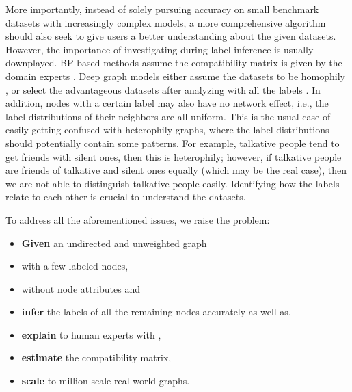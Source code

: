 
More importantly, instead of solely pursuing accuracy on small benchmark datasets with increasingly complex models, a more comprehensive algorithm should also seek to give users a better understanding about the given datasets. 
However, the importance of investigating \neteffect during label inference is usually downplayed.
BP-based methods assume the compatibility matrix is given by the domain experts \cite{DBLP:journals/pvldb/GatterbauerGKF15}.
Deep graph models either assume the datasets to be homophily \cite{kipf2016semi, wu2019simplifying}, or select the advantageous datasets after analyzing with all the labels \cite{ma2022is, lim2021large}.
In addition, nodes with a certain label may also have no network effect, i.e., the label distributions of their neighbors are all uniform. This is the usual case of easily getting confused with heterophily graphs, where the label distributions should potentially contain some patterns. For example, talkative people tend to get friends with silent ones, then this is heterophily; however, if talkative people are friends of talkative and silent ones equally (which may be the real case), then we are not able to distinguish talkative people easily. Identifying how the labels relate to each other is crucial to understand the datasets.

To address all the aforementioned issues, we raise the problem:
\begin{iprob}
	\hfill
	\begin{itemize}[leftmargin=20pt]
		\item {\bfseries Given} an undirected and unweighted graph
		\bit
			\item with a few labeled nodes,
			\item without node attributes and
		\eit
		\item {\bfseries infer} the labels of all the remaining nodes accurately as well as,
		\bit
			\item {\bfseries explain} to human experts with \neteffect,
			\item {\bfseries estimate} the compatibility matrix,
			\item {\bfseries scale} to million-scale real-world graphs.
		\eit
	\end{itemize}
\end{iprob}

